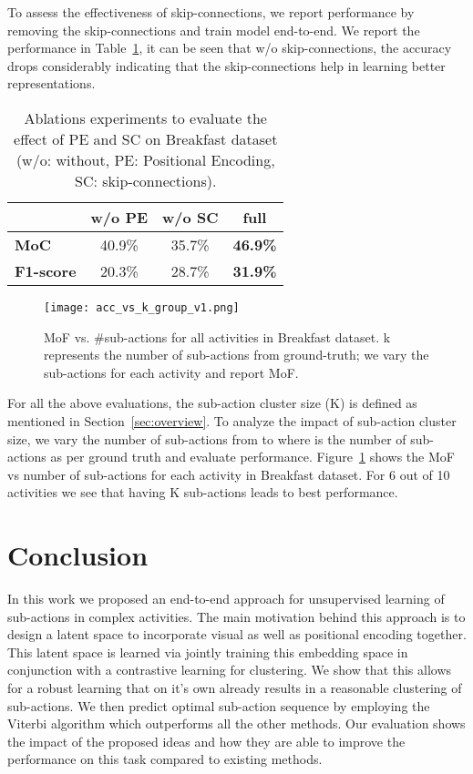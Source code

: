 \documentclass[final]{cvpr}
\begin{document}
 To assess the effectiveness of skip-connections, we report performance by removing the skip-connections and train model end-to-end. We report the performance in Table~\ref{tab:ablation}, it can be seen that w/o skip-connections, the accuracy drops considerably indicating that the skip-connections help in learning better representations.


\begin{table}[h]
 \caption{{\small Ablations experiments to evaluate the effect of PE and SC on Breakfast dataset (w/o: without, PE: Positional Encoding, SC: skip-connections).} 
 }
    \label{tab:ablation}
    \centering
    \begin{tabular}{l|cc|c}
    \toprule
     & \textbf{w/o PE} & \textbf{w/o SC} & \textbf{full} \\
     \midrule
     \textbf{MoC} & 40.9\% & 35.7\% & \textbf{46.9\%} \\
     \textbf{F1-score} & 20.3\% & 28.7\%  & \textbf{31.9\%} \\
    \bottomrule
    \end{tabular}
\end{table}

\begin{figure}
  \texttt{[image: acc\_vs\_k\_group\_v1.png]}
  \caption{{\small MoF vs. \#sub-actions for all activities in Breakfast dataset. k represents the number of sub-actions from ground-truth; we vary the sub-actions for each activity and report MoF.
  }}\vspace{-0.2cm}
 \label{fig:ablation_acc_vs_act}
\end{figure}

 For all the above evaluations, the sub-action cluster size (K) is defined as mentioned in Section~\ref{sec:overview}. To analyze the impact of sub-action cluster size, we vary the number of sub-actions from  to  where  is the number of sub-actions as per ground truth and evaluate performance. Figure~\ref{fig:ablation_acc_vs_act} shows the MoF vs number of sub-actions for each activity in Breakfast dataset. For 6 out of 10 activities we see that having K sub-actions leads to best performance.


\section{Conclusion}
In this work we proposed an end-to-end approach for unsupervised learning of sub-actions in complex activities. The main motivation behind this approach is to design a latent space to incorporate visual as well as positional encoding together. This latent space is learned via jointly training this embedding space in conjunction with a contrastive learning for clustering. We show that this allows for a robust learning that on it's own already results in a reasonable clustering of sub-actions. We then predict optimal sub-action sequence by employing the Viterbi algorithm which outperforms all the other methods. Our evaluation shows the impact of the proposed ideas and how they are able to improve the performance on this task compared to existing methods.

{\small


}
\end{document}
